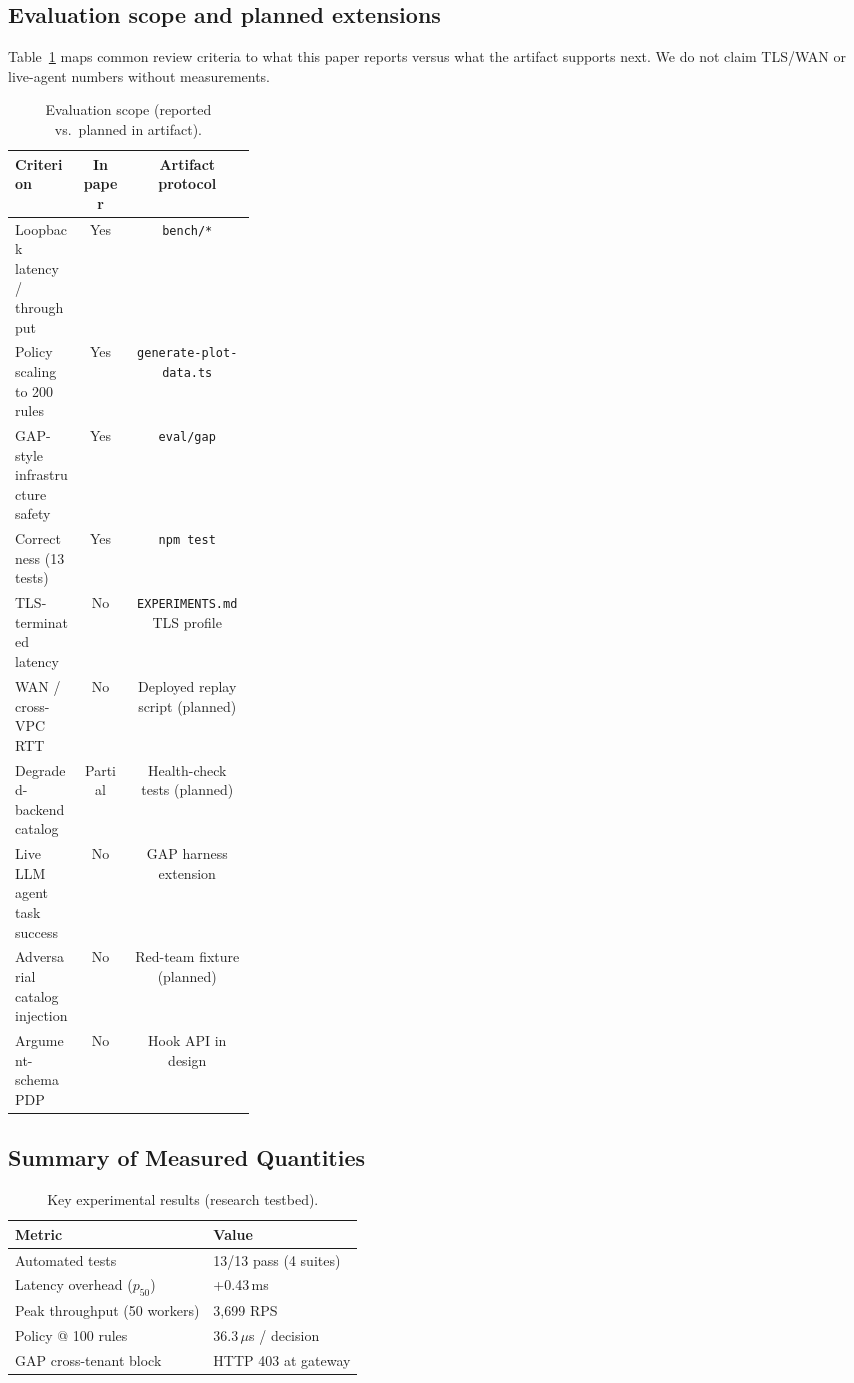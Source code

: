 \documentclass[11pt]{article}
\newcommand{\code}[1]{\texttt{#1}}
\begin{document}
\subsection{Evaluation scope and planned extensions}

Table~\ref{tab:scope} maps common review criteria to what this paper reports versus what the artifact supports next.
We do not claim TLS/WAN or live-agent numbers without measurements.

\begin{table}[H]
\centering
\caption{Evaluation scope (reported vs.\ planned in artifact).}
\label{tab:scope}
\footnotesize
\begin{tabular}{@{}p{0.28\linewidth}cc@{}}
\toprule
Criterion & In paper & Artifact protocol \\
\midrule
Loopback latency / throughput & Yes & \code{bench/*} \\
Policy scaling to 200 rules & Yes & \code{generate-plot-data.ts} \\
GAP-style infrastructure safety & Yes & \code{eval/gap} \\
Correctness (13 tests) & Yes & \code{npm test} \\
TLS-terminated latency & No & \code{EXPERIMENTS.md} TLS profile \\
WAN / cross-VPC RTT & No & Deployed replay script (planned) \\
Degraded-backend catalog & Partial & Health-check tests (planned) \\
Live LLM agent task success & No & GAP harness extension \\
Adversarial catalog injection & No & Red-team fixture (planned) \\
Argument-schema PDP & No & Hook API in design \\
\bottomrule
\end{tabular}
\end{table}

\subsection{Summary of Measured Quantities}

\begin{table}[H]
\centering
\caption{Key experimental results (research testbed).}
\label{tab:summary}
\small
\begin{tabular}{@{}ll@{}}
\toprule
Metric & Value \\
\midrule
Automated tests & 13/13 pass (4 suites) \\
Latency overhead ($p_{50}$) & +0.43\,ms \\
Peak throughput (50 workers) & 3{,}699 RPS \\
Policy @ 100 rules & 36.3\,$\mu$s / decision \\
GAP cross-tenant block & HTTP 403 at gateway \\
\bottomrule
\end{tabular}
\end{table}
\end{document}
